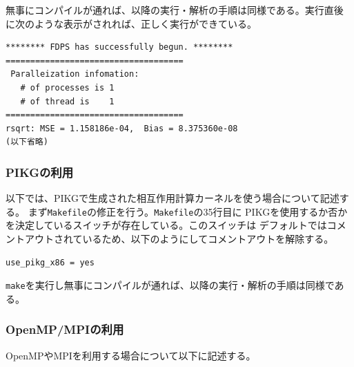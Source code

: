 \documentclass[12pt,a4paper,dvipdfmx]{jarticle}
\begin{document}
無事にコンパイルが通れば、以降の実行・解析の手順は同様である。実行直後
に次のような表示がされれば、正しく実行ができている。
\begin{screen}
\begin{verbatim}
******** FDPS has successfully begun. ********
====================================
 Paralleization infomation:
   # of processes is 1
   # of thread is    1
====================================
rsqrt: MSE = 1.158186e-04,  Bias = 8.375360e-08
(以下省略)
\end{verbatim}
\end{screen}

\subsubsection{PIKGの利用}

以下では、PIKGで生成された相互作用計算カーネルを使う場合について記述する。
まず\texttt{Makefile}の修正を行う。\texttt{Makefile}の35行目に
PIKGを使用するか否かを決定しているスイッチが存在している。このスイッチは
デフォルトではコメントアウトされているため、以下のようにしてコメントアウトを解除する。
\begin{screen}
\begin{verbatim}
use_pikg_x86 = yes
\end{verbatim}
\end{screen}

\texttt{make}を実行し無事にコンパイルが通れば、以降の実行・解析の手順は同様である。

\subsubsection{OpenMP/MPIの利用}

OpenMPやMPIを利用する場合について以下に記述する。
\end{document}
